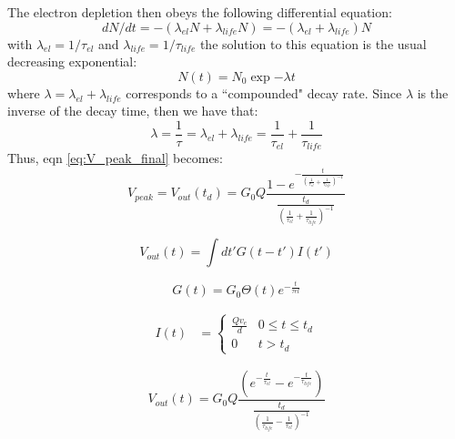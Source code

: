 The electron depletion then obeys the following differential equation:
\begin{equation}
dN/dt = -(\lambda_{el} N + \lambda_{life} N) = - (\lambda_{el} + \lambda_{life}) N
\end{equation}
with $\lambda_{el}=1/\tau_{el}$ and $\lambda_{life}=1/\tau_{life}$
the solution to this equation is the usual decreasing exponential:
\begin{equation}
N(t) = N_0 \exp{-\lambda t}
\end{equation}
where $\lambda = \lambda_{el} + \lambda_{life}$ corresponds to a ``compounded" decay rate. Since $\lambda$ is the inverse of the decay time, then we have that:
\begin{equation}
\lambda = \frac{1}{\tau} = \lambda_{el} + \lambda_{life} = \frac{1}{\tau_{el}} + \frac{1}{\tau_{life}}
\end{equation}
Thus, eqn \ref{eq:V_peak_final} becomes:
\begin{equation}
V_{peak} = V_{out} (t_d) = G_0 Q \frac{1-e^{-\frac{t}{(\frac{1}{\tau_{el}}+\frac{1}{\tau_{life}})^{-1}}}}{\frac{t_d}{(\frac{1}{\tau_{el}}+\frac{1}{\tau_{life}})^{-1}}}
\end{equation}

\begin{equation}
V_{out} (t) = \int dt' G(t-t') I(t') 
\end{equation}

\begin{equation}
G(t) = G_0 \Theta(t) e^{-\frac{t}{\tau{el}}}
\end{equation}

\begin{align}
 I(t) &=
  \begin{cases}
   \frac{Q v_e}{d}        & 0 \leq t \leq t_d \\
   0        			& t > t_d
  \end{cases}
 \end{align}

\begin{equation}
V_{out}(t) = G_0 Q \frac{
\left(e^{-\frac{t}{\tau_{el}}}-e^{-\frac{t}{\tau_{life}}}\right)
}{
\frac{t_d}{\left (\frac{1}{\tau_{life}}-\frac{1}{\tau_{el}}\right )^{-1}}
}
\end{equation}
